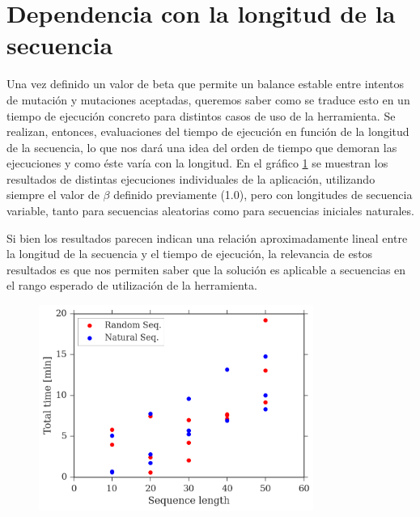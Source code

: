 \section{Dependencia con la longitud de la secuencia}

Una vez definido un valor de beta que permite un balance estable entre intentos de mutación y mutaciones aceptadas, queremos saber como se traduce esto en un tiempo de ejecución concreto para distintos casos de uso de la herramienta.
Se realizan, entonces, evaluaciones del tiempo de ejecución en función de la longitud de la secuencia, lo que nos dará una idea del orden de tiempo que demoran las ejecuciones y como éste varía con la longitud.
En el gráfico \ref{fig:time-vs-length} se muestran los resultados de distintas ejecuciones individuales de la aplicación, utilizando siempre el valor de $\beta$ definido previamente (1.0), pero con longitudes de secuencia variable, 
tanto para secuencias aleatorias como para secuencias iniciales naturales.

Si bien los resultados parecen indican una relación aproximadamente lineal entre la longitud de la secuencia y el tiempo de ejecución, la relevancia de estos resultados es que nos permiten 
saber que la solución es aplicable a secuencias en el rango esperado de utilización de la herramienta. 

\begin{figure}[htbp]
\centering
\includegraphics[width=0.8\textwidth]{img/resultados/lengthVsTime.png}
\caption{}
\label{fig:time-vs-length}
\end{figure}





